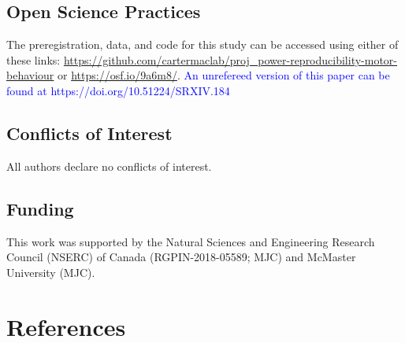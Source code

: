 \documentclass[
  man, donotrepeattitle,mask,floatsintext]{apa7}
\begin{document}
\hypertarget{open-science-practices}{%
\subsection{Open Science Practices}\label{open-science-practices}}

\noindent The preregistration, data, and code for this study can be accessed using either of these links: \url{https://github.com/cartermaclab/proj_power-reproducibility-motor-behaviour} or \url{https://osf.io/9a6m8/}. \textcolor{blue}{An unrefereed version of this paper can be found at https://doi.org/10.51224/SRXIV.184}

\hypertarget{conflicts-of-interest}{%
\subsection{Conflicts of Interest}\label{conflicts-of-interest}}

\noindent All authors declare no conflicts of interest.

\hypertarget{funding}{%
\subsection{Funding}\label{funding}}

\noindent This work was supported by the Natural Sciences and Engineering Research Council (NSERC) of Canada (RGPIN-2018-05589; MJC) and McMaster University (MJC).

\pagebreak

\hypertarget{references}{%
\section{References}\label{references}}

\vspace{2ex}
\end{document}
